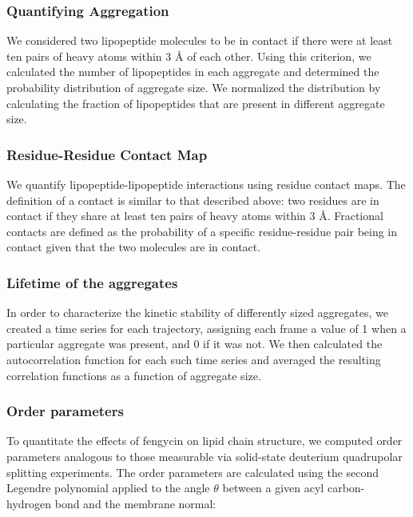 \subsubsection{Quantifying Aggregation}
\label{sss:ch2_agg}
We considered two lipopeptide molecules to be in contact if there were
at least ten pairs of heavy atoms within 3 {\AA} of each other.
Using this criterion, we calculated the number of lipopeptides in each aggregate
and determined the probability distribution of aggregate size.
We normalized the distribution by calculating the fraction of lipopeptides that are present in different
aggregate size.

\subsubsection{Residue-Residue Contact Map}
\label{sss:ch2_res-res_contact}

We quantify lipopeptide-lipopeptide interactions using residue contact maps.
The definition of a contact is similar to that described above: two residues are
in contact if they share at least ten pairs of heavy atoms within 3 {\AA}.
Fractional contacts are defined as the probability of a specific residue-residue
pair being in contact given that the two molecules are in contact.

\subsubsection{Lifetime of the aggregates}
\label{sss:ch2_lifetime}

In order to characterize the kinetic stability of differently sized aggregates,
we created a time series for each trajectory, assigning each frame a value of 1
 when a particular aggregate was present, and 0 if it was not.
We then calculated the autocorrelation function
for each such time series and averaged the resulting correlation
functions as a function of aggregate size.

\subsubsection{Order parameters}
\label{sss:ch2_ord_param}

To quantitate the effects of fengycin on lipid chain structure, we computed
order parameters analogous to those measurable via solid-state deuterium quadrupolar
splitting experiments. The order parameters are calculated using the second
Legendre polynomial applied to the angle $\theta$ between a
given acyl carbon-hydrogen bond and the membrane normal:

